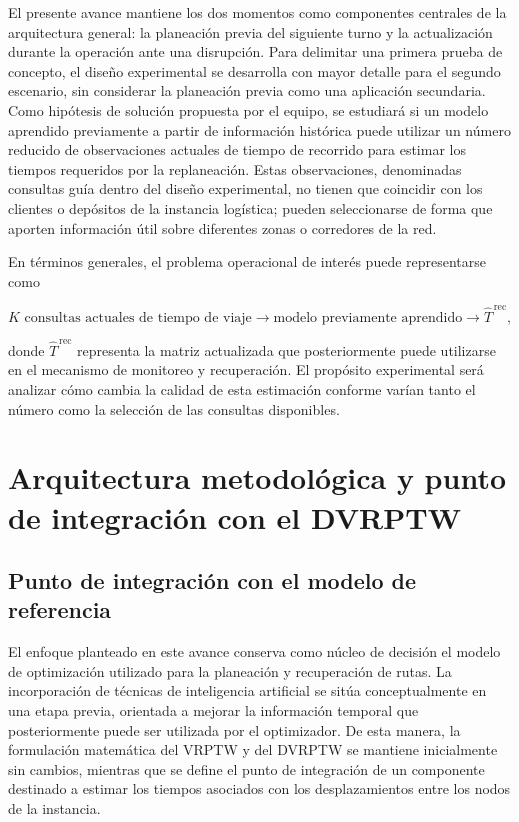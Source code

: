 \documentclass[11pt]{article}
\begin{document}
El presente avance mantiene los dos momentos como componentes centrales de la
arquitectura general: la planeación previa del siguiente turno y la
actualización durante la operación ante una disrupción. Para delimitar una
primera prueba de concepto, el diseño experimental se desarrolla con mayor
detalle para el segundo escenario, sin considerar la planeación previa como una
aplicación secundaria. Como hipótesis de solución propuesta por el equipo, se
estudiará si un modelo aprendido previamente a partir de información histórica
puede utilizar un número reducido de observaciones actuales de tiempo de
recorrido para estimar los tiempos requeridos por la replaneación. Estas
observaciones, denominadas consultas guía dentro del diseño experimental, no
tienen que coincidir con los clientes o depósitos de la instancia logística;
pueden seleccionarse de forma que aporten información útil sobre diferentes
zonas o corredores de la red.

En términos generales, el problema operacional de interés puede representarse
como

\[
K\text{ consultas actuales de tiempo de viaje}
\longrightarrow
\text{modelo previamente aprendido}
\longrightarrow
\widehat{T}^{\,\mathrm{rec}},
\]

donde \(\widehat{T}^{\,\mathrm{rec}}\) representa la matriz actualizada que
posteriormente puede utilizarse en el mecanismo de monitoreo y recuperación.
El propósito experimental será analizar cómo cambia la calidad de esta
estimación conforme varían tanto el número como la selección de las consultas
disponibles.

\section{Arquitectura metodológica y punto de integración con el DVRPTW}
\label{sec:arquitectura}

\subsection{Punto de integración con el modelo de referencia}

El enfoque planteado en este avance conserva como núcleo de decisión el
modelo de optimización utilizado para la planeación y recuperación de rutas.
La incorporación de técnicas de inteligencia artificial se sitúa
conceptualmente en una etapa previa, orientada a mejorar la información
temporal que posteriormente puede ser utilizada por el optimizador. De esta
manera, la formulación matemática del VRPTW y del DVRPTW se mantiene
inicialmente sin cambios, mientras que se define el punto de integración de
un componente destinado a estimar los tiempos asociados con los
desplazamientos entre los nodos de la instancia.
\end{document}
